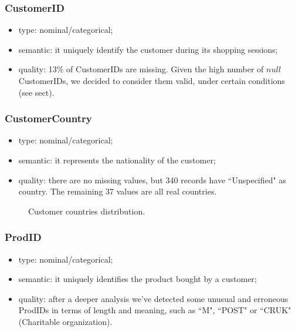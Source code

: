 \documentclass{article}
\begin{document}
\subsubsection{CustomerID}
\begin{itemize}
    \item type: nominal/categorical; 
    \item semantic: it uniquely identify the customer during its shopping sessions;
    \item quality: 13\% of CustomerIDs are missing. Given the high number of $null$ CustomerIDs, we decided to consider them valid, under certain conditions (see sect).
\end{itemize}

\subsubsection{CustomerCountry}
\begin{itemize}
    \item type: nominal/categorical;
    \item semantic: it represents the nationality of the customer;
    \item quality: there are no missing values, but 340 records have “Unspecified" as country. The remaining 37 values are all real countries.
\end{itemize}

\begin{center}
	\begin{figure}[ht!]
		\caption{Customer countries distribution.}
	\end{figure}
\end{center}

\subsubsection{ProdID}
\begin{itemize}
    \item type: nominal/categorical;
    \item semantic: it uniquely identifies the product bought by a customer;
    \item quality: after a deeper analysis we've detected some unusual and erroneous ProdIDs in terms of length and meaning, such as “M", “POST" or “CRUK" (Charitable organization).
\end{itemize}
\end{document}
